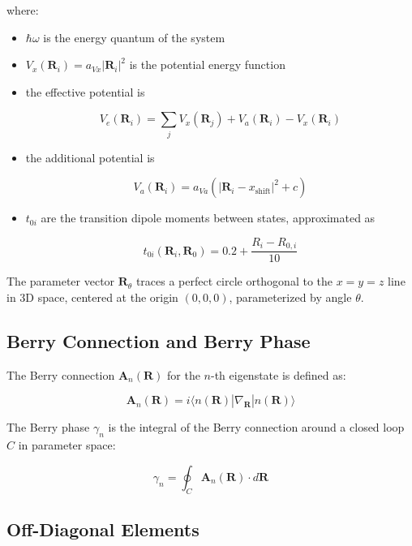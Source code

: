 \documentclass{article}
\begin{document}
where:
\begin{itemize}
    \item $\hbar\omega$ is the energy quantum of the system
    \item $V_x(\bm{R}_i) = a_{Vx} |\bm{R}_i|^2$ is the potential energy function
    \item the effective potential is
    
    \begin{equation}
        V_e(\bm{R}_i) = \sum_j V_x(\bm{R}_j) + V_a(\bm{R}_i) - V_x(\bm{R}_i)
    \end{equation}
    
    \item the additional potential is
    
    \begin{equation}
        V_a(\bm{R}_i) = a_{Va} (|\bm{R}_i - x_{\text{shift}}|^2 + c)
    \end{equation}
    \item $t_{0i}$ are the transition dipole moments between states, approximated as

    \begin{equation}
        t_{0i}(\bm{R}_i, \bm{R}_0) = 0.2 + \frac{R_i - R_{0,i}}{10}
    \end{equation}
\end{itemize}

The parameter vector $\bm{R}_\theta$ traces a perfect circle orthogonal to the $x=y=z$ line in 3D space, centered at the origin $(0, 0, 0)$, parameterized by angle $\theta$.

\subsection{Berry Connection and Berry Phase}

The Berry connection $\bm{A}_n(\bm{R})$ for the $n$-th eigenstate is defined as:

\begin{equation}
\bm{A}_n(\bm{R}) = i\langle n(\bm{R})|\nabla_{\bm{R}}|n(\bm{R})\rangle
\end{equation}

The Berry phase $\gamma_n$ is the integral of the Berry connection around a closed loop $C$ in parameter space:

\begin{equation}
\gamma_n = \oint_C \bm{A}_n(\bm{R}) \cdot d\bm{R}
\end{equation}

\subsection{Off-Diagonal Elements}
\end{document}

